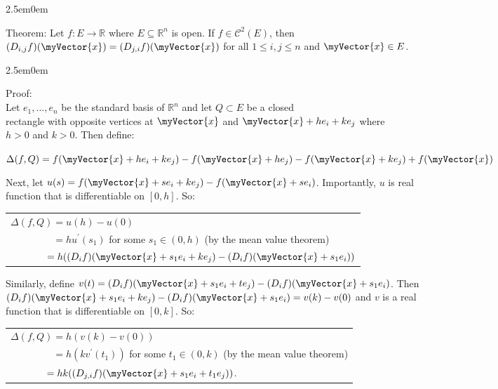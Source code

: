 \documentclass{book}
\newcommand{\hTwo}{%
   \color{MidnightBlue}%
   \fontsize{13}{15}\selectfont%
}
\newcommand{\hThree}{%
   \color{PineGreen!85!Orange}
   \fontsize{13}{15}\selectfont%
}
\newcommand{\hFour}{%
   \color{Cerulean}
   \fontsize{12}{14}\selectfont%
}
\newenvironment{myIndent}{%
   \begin{adjustwidth}{2.5em}{0em}%
}{%
   \end{adjustwidth}%
}
\newcommand{\uuline}[2][.]{%
{\vphantom{a}\color{#1}%
\rlap{\rule[-0.18em]{\widthof{#2}}{0.06em}}%
\rlap{\rule[-0.32em]{\widthof{#2}}{0.06em}}}%
#2}
\newcommand{\retTwo}{\hfill\bigbreak}
\newcommand{\mVec}[1]{\myVector{#1}}
\begin{document}
{\begin{myIndent}\hTwo
   \uuline{Theorem}: Let $f: E \longrightarrow \mathbb{R}$ where $E \subseteq \mathbb{R}^n$ is open. If $f \in \mathscr{C}^2(E)$, then\\ $(D_{i,j}f)(\mVec{x}) = (D_{j,i}f)(\mVec{x})$ for all $1 \leq i,j \leq n$ and $\mVec{x} \in E$.\\ [-8pt]

   \begin{myIndent}\hThree
      Proof:\\
      Let $e_1, \ldots, e_n$ be the standard basis of $\mathbb{R}^n$ and let $Q \subset E$ be a closed\\ rectangle with opposite vertices at $\mVec{x}$ and $\mVec{x} + he_i + ke_j$ where\\ $h > 0$ and $k > 0$. Then define:
      
      {\center $\Delta(f, Q) = f(\mVec{x} + he_i + ke_j) - f(\mVec{x} + he_j) - f(\mVec{x} + ke_j) + f(\mVec{x})$ \retTwo\par} 

      Next, let $u(s) = f(\mVec{x} + se_i + ke_j) - f(\mVec{x} + se_i)$. Importantly, $u$ is real\\ function that is differentiable on $[0, h]$. So:

      \begin{center}
         \begin{tabular}{l}
            $\Delta(f, Q) = u(h) - u(0)$ \\ [3pt]
            $\phantom{\Delta(f, Q)} = hu^\prime(s_1)$ \hspace{0.3em} for some $s_1 \in (0, h)$ \hspace{0.5em} {\hFour (by the mean value theorem)} \\ [3pt]
            $\phantom{\Delta(f, Q)} = h((D_if)(\mVec{x} + s_1e_i + ke_j) - (D_if)(\mVec{x} + s_1e_i))$
         \end{tabular}\retTwo
      \end{center}

      Similarly, define $v(t) = (D_if)(\mVec{x} + s_1e_i + te_j) - (D_if)(\mVec{x} + s_1e_i)$. Then\\ $(D_if)(\mVec{x} + s_1e_i + ke_j) - (D_if)(\mVec{x} + s_1e_i) = v(k) - v(0)$ and $v$ is a real\\ function that is differentiable on $[0, k]$. So:

      \begin{center}
         \begin{tabular}{l}
            $\Delta(f, Q) = h(v(k) - v(0))$ \\ [3pt]
            $\phantom{\Delta(f, Q)} = h(kv^\prime(t_1))$  \hspace{0.3em} for some $t_1 \in (0, k)$ \hspace{0.5em} {\hFour (by the mean value theorem)}\\ [3pt]
            $\phantom{\Delta(f, Q)} = hk((D_{j,i}f)(\mVec{x} + s_1e_i + t_1e_j))$.
         \end{tabular}\retTwo
      \end{center}


\end{myIndent}
\end{myIndent}}
\end{document}
